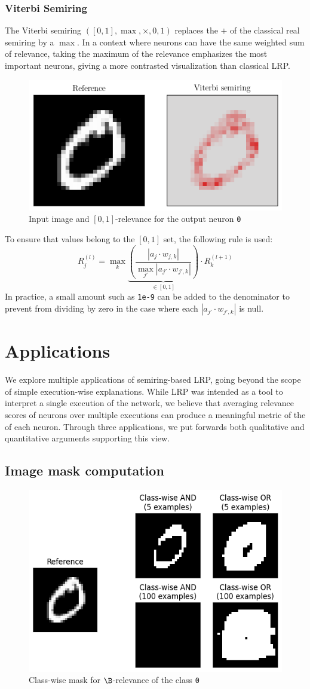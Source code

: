 \documentclass{../cs-classes/cs-classes}
\newcommand*{\1}{\digitsbb{1}}
\newcommand*{\0}{\digitsbb{0}}
\begin{document}
\subsubsection{Viterbi Semiring}
The Viterbi semiring $([0, 1], \max, \times, 0, 1)$ replaces the $+$ of the classical real semiring by a $\max$. In a context where neurons can have the same weighted sum of relevance, taking the maximum of the relevance emphasizes the most important neurons, giving a more contrasted visualization than classical LRP. 
\begin{figure}[H]
    \centering
    \includegraphics[width=.5\textwidth]{viterbi.png}
    \caption{Input image and $[0, 1]$-relevance for the output neuron \texttt{0}}
\end{figure}
To ensure that values belong to the $[0, 1]$ set, the following rule is used:
\begin{equation}
    R^{(l)}_j = \max_k \underbrace{\left(\frac{\left|a_j\cdot w_{j, k}\right|}{\max_{j'} \left|a_{j'}\cdot w_{j', k}\right|}\right)}_{\in[0, 1]} \cdot R^{(l+1)}_k
\end{equation}
In practice, a small amount such as \texttt{1e-9} can be added to the denominator to prevent from dividing by zero in the case where each $|a_{j'}\cdot w_{j',k}|$ is null.


\section{Applications}
We explore multiple applications of semiring-based LRP, going beyond the scope of simple execution-wise explanations. While LRP was intended as a tool to interpret a single execution of the network, we believe that averaging relevance scores of neurons over multiple executions can produce a meaningful metric of the  of each neuron. Through three applications, we put forwards both qualitative and quantitative arguments supporting this view.

\subsection{Image mask computation}
\begin{figure}[H]
    \centering
    \includegraphics[width=.5\textwidth]{boolean-mask.png}
    \caption{Class-wise mask for $\B$-relevance of the class \texttt{0}}
\end{figure}
\end{document}
